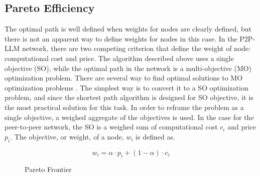 \documentclass[preprint,twoside,11pt]{article}
\begin{document}
\subsection{Pareto Efficiency}

The optimal path is well defined when weights for nodes are clearly defined, but there is not an apparent way to define
weights for nodes in this case. In the P2P-LLM network, there are two competing criterion that define the weight of node: computational cost and price.
The algorithm described above uses a single objective (SO), while the optimal path in the network is a multi-objective (MO) optimization problem.
There are several way to find optimal solutions to MO optimization problems \citep{1599245}. The simplest way is to convert it to a SO optimization problem, and
since the shortest path algorithm is designed for SO objective, it is the most practical solution for this task. In order to reframe the problem as a single objective,
a weighed aggregate of the objectives is used. In the case for the peer-to-peer network, the SO is a weighed sum of computational cost $c_i$ and price $p_i$.
The objective, or weight, of a node, $w_i$ is defined as.

\begin{equation}
	w_i = \alpha \cdot p_i + (1 - \alpha) \cdot c_i
	\label{eq:weight}
\end{equation}

\begin{figure}
	\centering
	\caption{Pareto Frontier}
	\label{fig:Pareto-optimal}
\end{figure}
\end{document}
